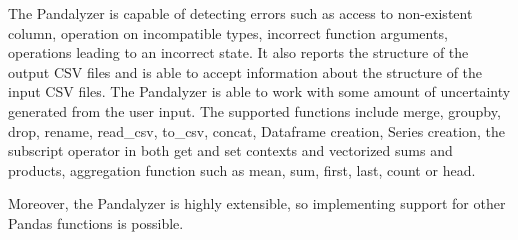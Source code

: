 \large
The Pandalyzer is capable of detecting errors such as access to non-existent column, operation on incompatible types,
incorrect function arguments, operations leading to an incorrect state.
It also reports the structure of the output CSV files and is able to accept information about the structure of the input CSV files.
The Pandalyzer is able to work with some amount of uncertainty generated from the user input.
The supported functions include merge, groupby, drop, rename, read\_csv, to\_csv, concat, Dataframe creation,
Series creation, the subscript operator in both get and set contexts and vectorized sums and products, aggregation function
such as mean, sum, first, last, count or head.

Moreover, the Pandalyzer is highly extensible, so implementing support for other Pandas functions is possible.
